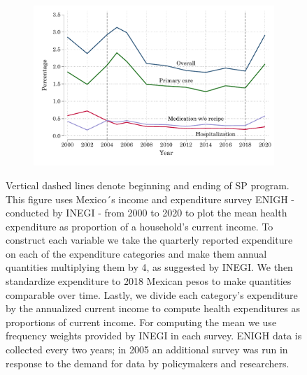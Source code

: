 \begin{figure}[H]
    \caption{Health expenditure as proportion of current income}
    \label{health_expenditure_share}
\begin{center}
\begin{subfigure}{0.60\textwidth}
        \includegraphics[width=\textwidth]{Figuras/oop_evolution_percentages.pdf}
    \end{subfigure}
 \end{center}
 \scriptsize 
    Vertical dashed lines denote beginning and ending of 
 SP program. This figure uses Mexico´s income and expenditure survey ENIGH - conducted by INEGI - from 2000 to 2020 to plot the mean health expenditure as proportion of a household's current income. To construct each variable we take the quarterly reported expenditure on each of the expenditure categories and make them annual quantities multiplying them by 4, as suggested by INEGI. We then standardize expenditure to 2018 Mexican pesos to make quantities comparable over time. Lastly, we divide each category's expenditure by the annualized current income to compute health expenditures as proportions of current income. For computing the mean we use frequency weights provided by INEGI in each survey. ENIGH data is collected every two years; in 2005 an additional survey was run in response to the demand for data by policymakers and researchers.
\end{figure}

\vspace{.2in}



